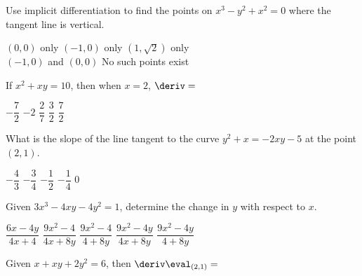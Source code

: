 \begin{questions}
    \question Use implicit differentiation to find the points on $x^3 - y^2 + x^2 = 0$ where the tangent line is vertical. \\

    \begin{oneparchoices}
        \choice $(0, 0)$ only
        \choice $(-1, 0)$ only
        \choice $\left(1, \sqrt{2}\right)$ only \\[11pt]
        \makebox[0.19\textwidth] \choice $(-1, 0)$ and $(0, 0)$
        \makebox[0.21\textwidth] \choice No such points exist
    \end{oneparchoices} \par \horizontalline

    \question If $x^2 + xy = 10$, then when $x = 2$, $\deriv = $ \\
    
    \begin{oneparchoices}
        \choice $-\dfrac{7}{2}$
        \choice $-2$
        \choice $\dfrac{2}{7}$
        \choice $\dfrac{3}{2}$
        \choice $\dfrac{7}{2}$
    \end{oneparchoices} \par \horizontalline

    \question What is the slope of the line tangent to the curve $y^2 + x = -2xy - 5$ at the point $(2, 1)$. \\

    \begin{oneparchoices}
        \choice $-\dfrac{4}{3}$
        \choice $-\dfrac{3}{4}$
        \choice $-\dfrac{1}{2}$
        \choice $-\dfrac{1}{4}$
        \choice $0$
    \end{oneparchoices} \par \horizontalline

    \question Given $3x^3 - 4xy - 4y^2 = 1$, determine the change in $y$ with respect to $x$. \\

    \begin{oneparchoices}
        \choice $\dfrac{6x - 4y}{4x + 4}$
        \choice $\dfrac{9x^2 - 4}{4x + 8y}$
        \choice $\dfrac{9x^2 - 4}{4 + 8y}$
        \choice $\dfrac{9x^2 - 4y}{4x + 8y}$
        \choice $\dfrac{9x^2 - 4y}{4 + 8y}$
    \end{oneparchoices} \par \horizontalline

    \question Given $x + xy + 2y^2 = 6$, then $\deriv \eval_{(2, 1)} = $ \\


\end{questions}
